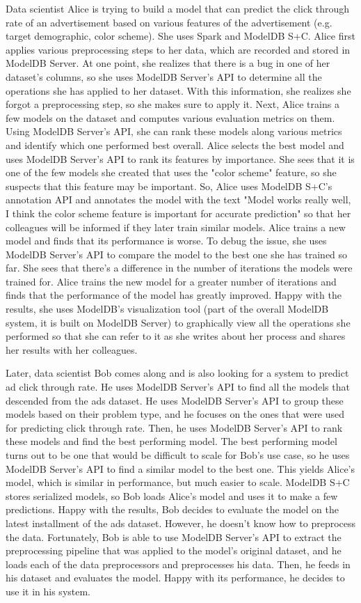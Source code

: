 Data scientist Alice is trying to build a model that can predict the click through rate
of an advertisement based on various features of the advertisement (e.g. target demographic,
color scheme). She uses Spark and ModelDB S+C. Alice first applies various preprocessing steps to
her data, which are recorded and stored in ModelDB Server. At one point, she realizes that there
is a bug in one of her dataset's columns, so she uses ModelDB Server's API to determine
all the operations she has applied to her dataset. With this information, she realizes she forgot a preprocessing step, so
she makes sure to apply it.
Next, Alice trains a few models on the dataset and computes various evaluation metrics on them. Using
ModelDB Server's API, she can rank these models along various metrics and identify which one performed
best overall. Alice selects the best model and uses ModelDB Server's API to 
rank its features by importance. She sees that it is one of the few 
models she created that uses the "color scheme" feature, so she suspects 
that this feature may be important. So, Alice uses ModelDB S+C's annotation API and 
annotates the model with the text "Model works really well, I think the color scheme feature is
important for accurate prediction" so that her colleagues will be informed if they later train
similar models. Alice trains a new model and finds that its performance
is worse. To debug the issue, she uses ModelDB Server's API to compare the model
to the best one she has trained so far. She sees that there's a difference in the number of iterations
the models were trained for. Alice trains the new model for a greater number of iterations and finds
that the performance of the model has greatly improved. Happy with the results, she uses ModelDB's visualization
tool (part of the overall ModelDB system, it is built on ModelDB Server) to graphically view all the operations 
she performed so that she can refer to it as she writes about her process and shares her results with her colleagues.

Later, data scientist Bob comes along and is also looking for a system to predict 
ad click through rate. He uses ModelDB Server's API to find all the models that 
descended from the ads dataset. He uses ModelDB Server's API to group these models
based on their problem type, and he focuses on the ones that were used for predicting click
through rate. Then, he uses ModelDB Server's API to rank these models and find the best performing
model. The best performing model turns out to be one that would be difficult to scale for Bob's
use case, so he uses ModelDB Server's API to find a similar model to the best one. This yields
Alice's model, which is similar in performance, but much easier to scale. ModelDB S+C stores serialized models, so
Bob loads Alice's model and uses it to make a few predictions. Happy with the results, Bob
decides to evaluate the model on the latest installment of the ads dataset. However, he doesn't
know how to preprocess the data. Fortunately, Bob is able to use ModelDB Server's API to extract the 
preprocessing pipeline that was applied to the model's original dataset, and he loads each of
the data preprocessors and preprocesses his data. Then, he feeds in his dataset and evaluates
the model. Happy with its performance, he decides to use it in his system.

